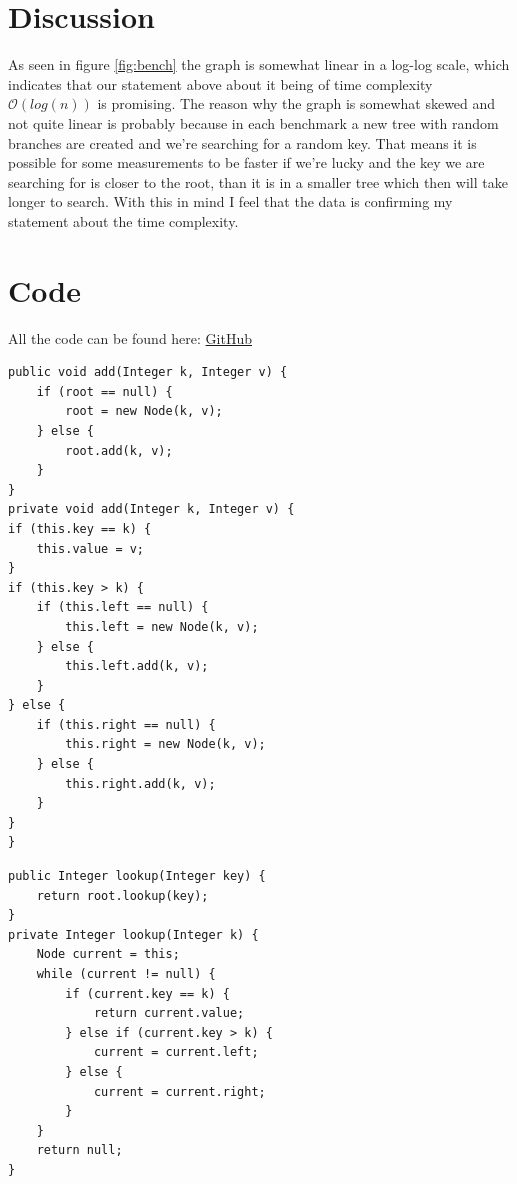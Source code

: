 \documentclass[a4paper,11pt]{article}
\newenvironment{code}{\captionsetup{type=listing}}{}
\begin{document}
\section{Discussion}
As seen in figure \ref{fig:bench} the graph is somewhat linear in a log-log scale, which
indicates that our statement above about it being of time complexity $\mathcal{O}(log(n))$
is promising. The reason why the graph is somewhat skewed and not quite linear is
probably because in each benchmark a new tree with random branches are created and
we're searching for a random key. That means it is possible for some measurements to be
faster if we're lucky and the key we are searching for is closer to the root, than it
is in a smaller tree which then will take longer to search. With this in mind I feel
that the data is confirming my statement about the time complexity.

\newpage
\FloatBarrier
\section*{Code}
All the code can be found here: \href{https://github.com/adrian-jonsson-sjoedin/ID1021-AlgoData/tree/main/Tasks/Trees/src}{GitHub}

\begin{code}
    \label{code:add}
    \begin{verbatim}
public void add(Integer k, Integer v) {
    if (root == null) {
        root = new Node(k, v);
    } else {
        root.add(k, v);
    }
}        
private void add(Integer k, Integer v) {
if (this.key == k) {
    this.value = v;
}
if (this.key > k) {
    if (this.left == null) {
        this.left = new Node(k, v);
    } else {
        this.left.add(k, v);
    }
} else {
    if (this.right == null) {
        this.right = new Node(k, v);
    } else {
        this.right.add(k, v);
    }
}
}
\end{verbatim}
\end{code}
\begin{code}
    \label{code:lookup}
    \begin{verbatim}
public Integer lookup(Integer key) {
    return root.lookup(key);
}
private Integer lookup(Integer k) {
    Node current = this;
    while (current != null) {
        if (current.key == k) {
            return current.value;
        } else if (current.key > k) {
            current = current.left;
        } else {
            current = current.right;
        }
    }
    return null;
}
\end{verbatim}
\end{code}
\end{document}
